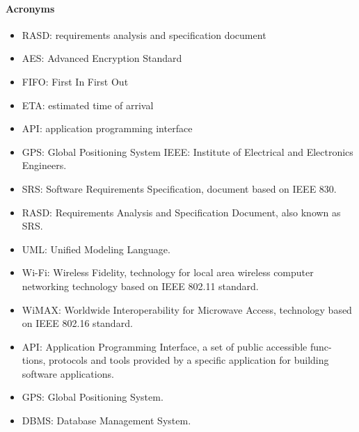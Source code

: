 \paragraph{Acronyms}
\begin{itemize}
	\item RASD: requirements analysis and specification document
	\item AES: Advanced Encryption Standard
	\item FIFO: First In First Out
	\item ETA: estimated time of arrival
	\item API: application programming interface
	\item GPS: Global Positioning System
	 IEEE: Institute of Electrical and Electronics Engineers.
	\item SRS: Software Requirements Specification, document based on IEEE 830.
	\item RASD: Requirements Analysis and Specification Document, also known as SRS.
	\item UML: Unified Modeling Language.
	\item Wi-Fi: Wireless Fidelity, technology for local area wireless computer networking technology based on IEEE 802.11 standard.
	\item WiMAX: Worldwide Interoperability for Microwave Access, technology based on IEEE 802.16 standard.
	\item API: Application Programming Interface, a set of public accessible func- tions, protocols and tools provided by a specific application for building software applications.
	\item GPS: Global Positioning System.
	\item DBMS: Database Management System.

\end{itemize}
